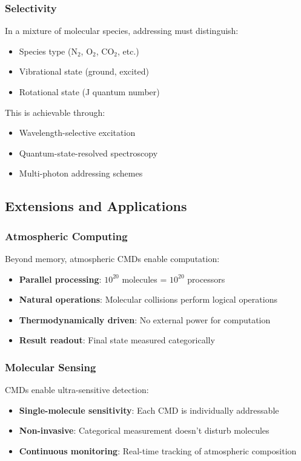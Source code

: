 \subsubsection{Selectivity}

In a mixture of molecular species, addressing must distinguish:
\begin{itemize}
\item Species type (N$_2$, O$_2$, CO$_2$, etc.)
\item Vibrational state (ground, excited)
\item Rotational state (J quantum number)
\end{itemize}

This is achievable through:
\begin{itemize}
\item Wavelength-selective excitation
\item Quantum-state-resolved spectroscopy
\item Multi-photon addressing schemes
\end{itemize}

\subsection{Extensions and Applications}

\subsubsection{Atmospheric Computing}

Beyond memory, atmospheric CMDs enable computation:
\begin{itemize}
\item \textbf{Parallel processing}: $10^{20}$ molecules = $10^{20}$ processors
\item \textbf{Natural operations}: Molecular collisions perform logical operations
\item \textbf{Thermodynamically driven}: No external power for computation
\item \textbf{Result readout}: Final state measured categorically
\end{itemize}

\subsubsection{Molecular Sensing}

CMDs enable ultra-sensitive detection:
\begin{itemize}
\item \textbf{Single-molecule sensitivity}: Each CMD is individually addressable
\item \textbf{Non-invasive}: Categorical measurement doesn't disturb molecules
\item \textbf{Continuous monitoring}: Real-time tracking of atmospheric composition
\end{itemize}

